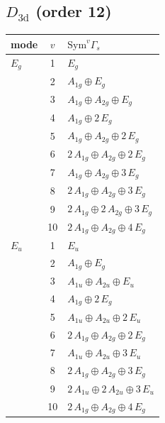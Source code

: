 \documentclass[11pt]{article}
\begin{document}
\subsection*{$D_{3\mathrm{d}}$ \quad (order 12)}
\begin{longtable}{l c p{}}
\hline mode & $v$ & $\mathrm{Sym}^v\Gamma_s$\\ \hline\endhead
$E_{g}$ & 1 & $E_{g}$\\
 & 2 & $A_{1g}\oplus E_{g}$\\
 & 3 & $A_{1g}\oplus A_{2g}\oplus E_{g}$\\
 & 4 & $A_{1g}\oplus 2\,E_{g}$\\
 & 5 & $A_{1g}\oplus A_{2g}\oplus 2\,E_{g}$\\
 & 6 & $2\,A_{1g}\oplus A_{2g}\oplus 2\,E_{g}$\\
 & 7 & $A_{1g}\oplus A_{2g}\oplus 3\,E_{g}$\\
 & 8 & $2\,A_{1g}\oplus A_{2g}\oplus 3\,E_{g}$\\
 & 9 & $2\,A_{1g}\oplus 2\,A_{2g}\oplus 3\,E_{g}$\\
 & 10 & $2\,A_{1g}\oplus A_{2g}\oplus 4\,E_{g}$\\
\hline
$E_{u}$ & 1 & $E_{u}$\\
 & 2 & $A_{1g}\oplus E_{g}$\\
 & 3 & $A_{1u}\oplus A_{2u}\oplus E_{u}$\\
 & 4 & $A_{1g}\oplus 2\,E_{g}$\\
 & 5 & $A_{1u}\oplus A_{2u}\oplus 2\,E_{u}$\\
 & 6 & $2\,A_{1g}\oplus A_{2g}\oplus 2\,E_{g}$\\
 & 7 & $A_{1u}\oplus A_{2u}\oplus 3\,E_{u}$\\
 & 8 & $2\,A_{1g}\oplus A_{2g}\oplus 3\,E_{g}$\\
 & 9 & $2\,A_{1u}\oplus 2\,A_{2u}\oplus 3\,E_{u}$\\
 & 10 & $2\,A_{1g}\oplus A_{2g}\oplus 4\,E_{g}$\\
\hline
\end{longtable}
\end{document}

